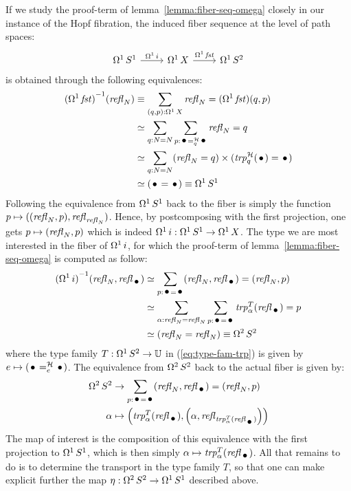 \documentclass[english,a4]{article}
\newcommand{\Sp}{{S^2}}%
\def\U{\universe U}%
\begin{document}
If we study the proof-term of lemma~\ref{lemma:fiber-seq-omega}
closely in our instance of the Hopf fibration, the induced fiber
sequence at the level of path spaces:
\begin{equation}
  \label{eq:12}
  \begin{tikzcd}
    \loopspace 1 \Sc \rar["\loopspace 1 i"] & \loopspace 1 X \rar["\loopspace 1 \fst"] & \loopspace 1 \Sp
  \end{tikzcd}
\end{equation}
is obtained through the following equivalences:
\begin{align}
  \inv {(\loopspace 1 \fst)} {(\refl N)}
  &\jdeq \sum_{(q,p):\loopspace 1 X}\refl N = (\loopspace 1 \fst)(q,p)
  \\
  &\weq \sum_{q:N=N}\sum_{p:\pathover \base {\hopffam} q \base}\refl N = q
  \\
  &\weq \sum_{q:N=N}(\refl N = q)\times(\trp[\hopffam]{q} (\base) =\base)
  \\
  &\weq (\base = \base) \jdeq \loopspace 1 \Sc
\end{align}
Following the equivalence from $\mathop{\Omega^{1}} {S^1}$ back to the fiber is
simply the function $p \mapsto ((\mathop{{\mathit{refl}}_{N}},p),\mathop{{\mathit{refl}}_{\mathop{{\mathit{refl}}_{N}}}})$. Hence,
by postcomposing with the first projection, one gets
$p \mapsto (\mathop{{\mathit{refl}}_{N}}, p)$ which is indeed
$\mathop{\Omega^{1}} i: \mathop{\Omega^{1}} {S^1} \to \mathop{\Omega^{1}} X$. The type we are
most interested in the fiber of $\mathop{\Omega^{1}} i$, for which the
proof-term of lemma~\ref{lemma:fiber-seq-omega} is computed as follow:
\begin{align}
  \inv {(\loopspace 1 i)} {(\refl N,\refl\base)}
  &\weq \sum_{p:\base = \base}(\refl N,\refl\base) = (\refl N,p)
  \\
  &\weq \sum_{\alpha:\refl N = \refl N}\sum_{p:\base=\base}\trp [T]{\alpha}(\refl \base)
 = p \label{eq:type-fam-trp}
  \\
  &\weq (\refl N = \refl N) \jdeq \loopspace 2 \Sp
\end{align}
where the type family $T:\loopspace 1 \Sp \to \U$ in
(\ref{eq:type-fam-trp}) is given by
$e\mapsto {(\pathover \base \hopffam e \base)}$. The equivalence from
$\loopspace 2 \Sp$ back to the actual fiber is given by:
\begin{equation}
  \begin{aligned}
    \loopspace 2 \Sp &\to \sum_{p:\base = \base}(\refl N,\refl\base) =
    (\refl N,p)
    \\
    \alpha &\mapsto \left(\trp[T]{\alpha}(\refl\base), \left(\alpha,
        \refl{\trp[T]{\alpha}(\refl\base)}\right)\right)
  \end{aligned}
\end{equation}
The map of interest is the composition of this equivalence with the
first projection to $\mathop{\Omega^{1}} {S^1}$, which is then simply
$\alpha \mapsto \trp[T]{\alpha}(\refl \base)$. All that remains to do
is to determine the transport in the type family $T$, so that one can
make explicit further the map $\eta:\loopspace 2 \Sp \to \loopspace 1 \Sc$
described above.
\end{document}
